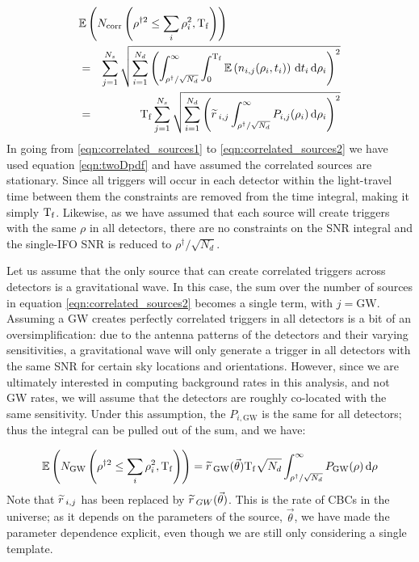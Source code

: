 \begin{eqnarray}
\label{eqn:correlated_sources1}
\lefteqn{\Exptd\left(N_{\mathrm{corr}} \left( \rho^{\dagger2} \leq \sum_i\rho_i^2, \Tf \right) \right) } \nonumber \\
 & = & \sum_{j=1}^{N_s} \sqrt{ \sum_{i=1}^{N_d} \left( \int_{\rho^{\dagger}/\sqrt{N_d}}^\infty \int_{0}^{\Tf} \Exptd\left(n_{i,j}(\rho_i,t_i)\right)\d t_i \d \rho_i \right)^2 } \\
\label{eqn:correlated_sources2}
 & = & \Tf \sum_{j=1}^{N_s} \sqrt{ \sum_{i=1}^{N_d} \left( \rsrc_{i,j} \int_{\rho^\dagger/\sqrt{N_d}}^\infty P_{i,j}(\rho_i) \d \rho_i \right)^2 }
\end{eqnarray}
In going from \ref{eqn:correlated_sources1} to \ref{eqn:correlated_sources2} we have used equation \ref{eqn:twoDpdf} and have assumed the correlated sources are stationary. Since all triggers will occur in each detector within the light-travel time between them the constraints are removed from the time integral, making it simply $\mathrm{T_f}$. Likewise, as we have assumed that each source will create triggers with the same $\rho$ in all detectors, there are no constraints on the \ac{SNR} integral and the single-\ac{IFO} \ac{SNR} is reduced to $\rho^\dagger/\sqrt{N_d}$.

Let us assume that the only source that can create correlated triggers across detectors is a gravitational wave. In this case, the sum over the number of sources in equation \ref{eqn:correlated_sources2} becomes a single term, with $j = \mathrm{GW}$. Assuming a \ac{GW} creates perfectly correlated triggers in all detectors is a bit of an oversimplification: due to the antenna patterns of the detectors and their varying sensitivities, a gravitational wave will only generate a trigger in all detectors with the same \ac{SNR} for certain sky locations and orientations. However, since we are ultimately interested in computing background rates in this analysis, and not \ac{GW} rates, we will assume that the detectors are roughly co-located with the same sensitivity. Under this assumption, the $P_{i,\mathrm{GW}}$ is the same for all detectors; thus the integral can be pulled out of the sum, and we have:

\begin{equation}
\label{eqn:correlated_GW_colocated}
\Exptd\left(N_{\mathrm{GW}} \left(\rho^{\dagger2} \leq  \sum_i\rho_i^2, \Tf \right) \right) = \rsrc_{\mathrm{GW}}(\vec{\theta}) \Tf \sqrt{N_d} \int_{\rho^\dagger/\sqrt{N_d}}^{\infty} P_{\mathrm{GW}}(\rho) \d \rho
\end{equation}
Note that $\widetilde{r}\,_{i,j}$ has been replaced by $\widetilde{r}\,_{GW}(\vec{\theta})$. This is the rate of \acp{CBC} in the universe; as it depends on the parameters of the source, $\vec{\theta}$, we have made the parameter dependence explicit, even though we are still only considering a single template.

